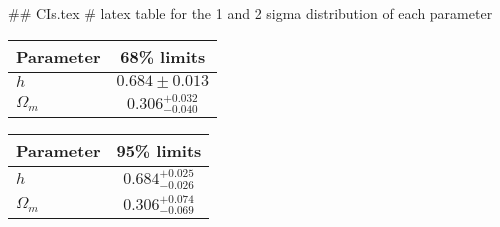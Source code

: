 ## CIs.tex
# latex table for the 1 and 2 sigma distribution of each parameter

\begin{tabular} { l  c}
 Parameter &  68\% limits\\
\hline
{\boldmath$h              $} & $0.684\pm 0.013            $\\
{\boldmath$\Omega_m       $} & $0.306^{+0.032}_{-0.040}   $\\
\hline
\end{tabular}

\begin{tabular} { l  c}
 Parameter &  95\% limits\\
\hline
{\boldmath$h              $} & $0.684^{+0.025}_{-0.026}   $\\
{\boldmath$\Omega_m       $} & $0.306^{+0.074}_{-0.069}   $\\
\hline
\end{tabular}
